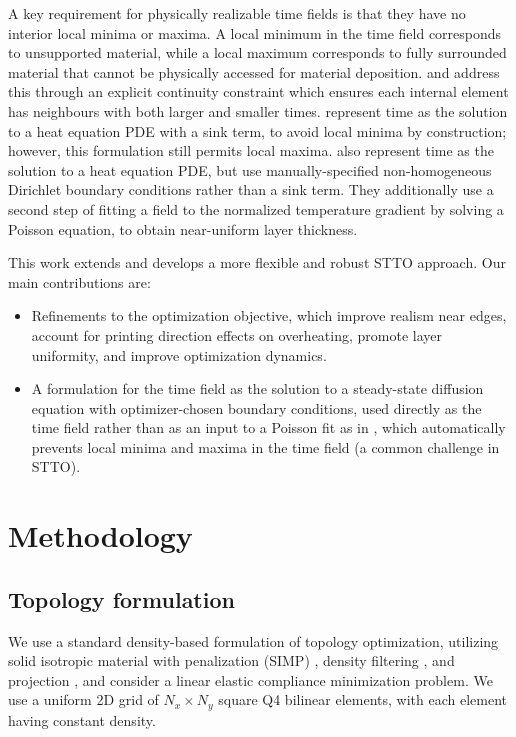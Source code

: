\documentclass{article}
\begin{document}
A key requirement for physically realizable time fields is that they have no interior local minima or maxima.
A local minimum in the time field corresponds to unsupported material, while a local maximum corresponds to fully surrounded material that cannot be physically accessed for material deposition.
\cite{wang2020spacetime} and \cite{das2023thesis} address this through an explicit continuity constraint which ensures each internal element has neighbours with both larger and smaller times.
\cite{Wang2024Regularization} represent time as the solution to a heat equation PDE with a sink term, to avoid local minima by construction; however, this formulation still permits local maxima.
\cite{Xu2025CurvedLayerSlicing} also represent time as the solution to a heat equation PDE, but use manually-specified non-homogeneous Dirichlet boundary conditions rather than a sink term.
They additionally use a second step of fitting a field to the normalized temperature gradient by solving a Poisson equation, to obtain near-uniform layer thickness.

This work extends \cite{das2023thesis} and develops a more flexible and robust STTO approach. Our main contributions are:
\begin{itemize}
    \item Refinements to the optimization objective, which improve realism near edges, account for printing direction effects on overheating, promote layer uniformity, and improve optimization dynamics.
    \item A formulation for the time field as the solution to a steady-state diffusion equation with optimizer-chosen boundary conditions, used directly as the time field rather than as an input to a Poisson fit as in \cite{Xu2025CurvedLayerSlicing}, which automatically prevents local minima and maxima in the time field (a common challenge in STTO).
\end{itemize}

\section{Methodology}
\subsection{Topology formulation}
We use a standard density-based formulation of topology optimization, utilizing solid isotropic material with penalization (SIMP) \cite{Bendsoe1989SimpFoundation, Zhou1991SimpFoundation}, density filtering \cite{BRUNS20013443DensityFilter}, and projection \cite{Guest2004DensityProjection, Wang2011RobustProjection}, and consider a linear elastic compliance minimization problem.
We use a uniform 2D grid of $N_x \times N_y$ square Q4 bilinear elements, with each element having constant density.
\end{document}

